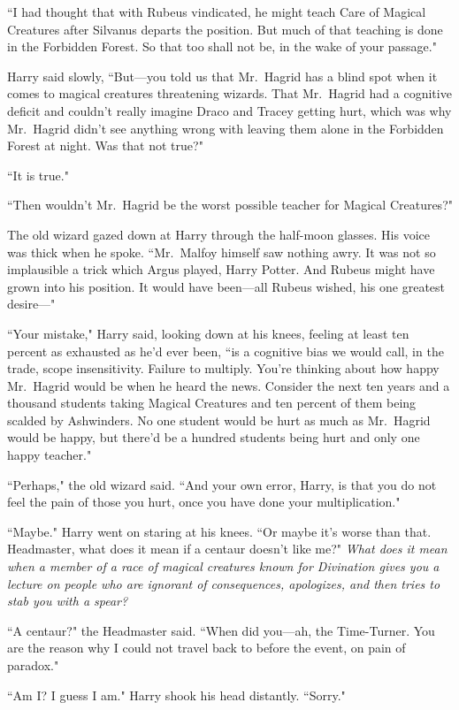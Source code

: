 ``I had thought that with Rubeus vindicated, he might teach Care of Magical Creatures after Silvanus departs the position. But much of that teaching is done in the Forbidden Forest. So that too shall not be, in the wake of your passage."

Harry said slowly, ``But—you told us that Mr.~Hagrid has a blind spot when it comes to magical creatures threatening wizards. That Mr.~Hagrid had a cognitive deficit and couldn't really imagine Draco and Tracey getting hurt, which was why Mr.~Hagrid didn't see anything wrong with leaving them alone in the Forbidden Forest at night. Was that not true?"

``It is true."

``Then wouldn't Mr.~Hagrid be the worst possible teacher for Magical Creatures?"

The old wizard gazed down at Harry through the half-moon glasses. His voice was thick when he spoke. ``Mr.~Malfoy himself saw nothing awry. It was not so implausible a trick which Argus played, Harry Potter. And Rubeus might have grown into his position. It would have been—all Rubeus wished, his one greatest desire—"

``Your mistake," Harry said, looking down at his knees, feeling at least ten percent as exhausted as he'd ever been, ``is a cognitive bias we would call, in the trade, scope insensitivity. Failure to multiply. You're thinking about how happy Mr.~Hagrid would be when he heard the news. Consider the next ten years and a thousand students taking Magical Creatures and ten percent of them being scalded by Ashwinders. No one student would be hurt as much as Mr.~Hagrid would be happy, but there'd be a hundred students being hurt and only one happy teacher."

``Perhaps," the old wizard said. ``And your own error, Harry, is that you do not feel the pain of those you hurt, once you have done your multiplication."

``Maybe." Harry went on staring at his knees. ``Or maybe it's worse than that. Headmaster, what does it mean if a centaur doesn't like me?" \emph{What does it mean when a member of a race of magical creatures known for Divination gives you a lecture on people who are ignorant of consequences, apologizes, and then tries to stab you with a spear?}

``A centaur?" the Headmaster said. ``When did you—ah, the Time-Turner. You are the reason why I could not travel back to before the event, on pain of paradox."

``Am I? I guess I am." Harry shook his head distantly. ``Sorry."

